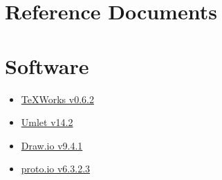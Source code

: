 \section{Reference Documents}

\section{Software}
\begin{itemize}
\item \href{http://www.tug.org/texworks/}{TeXWorks v0.6.2}
\item \href{https://www.umlet.com/}{Umlet v14.2}
\item \href{https://about.draw.io/}{Draw.io v9.4.1}
\item \href{https://proto.io/}{proto.io v6.3.2.3}
\end{itemize}